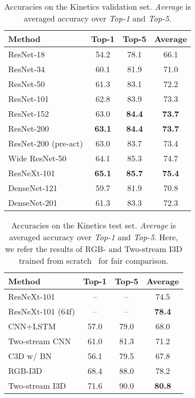 \documentclass[10pt,twocolumn,letterpaper]{article}
\begin{document}
    \begin{table}[t]
      \centering
      \captionsetup{width=0.95\linewidth}
      \caption{
        Accuracies on the Kinetics validation set.
        \textit{Average} is averaged accuracy over \textit{Top-1} and \textit{Top-5}.
      }\label{tbl:kinetics_val}
      \begin{tabular}{lccc}
        \toprule
        Method & Top-1 & Top-5 & Average \\
        \midrule
        ResNet-18 & 54.2 & 78.1 & 66.1 \\
        ResNet-34 & 60.1 & 81.9 & 71.0 \\
        ResNet-50 & 61.3 & 83.1 & 72.2 \\
        ResNet-101 & 62.8 & 83.9 & 73.3 \\
        ResNet-152 & 63.0 & \textbf{84.4} & \textbf{73.7} \\
        ResNet-200 & \textbf{63.1} & \textbf{84.4} & \textbf{73.7} \\
        \midrule
        ResNet-200 (pre-act) & 63.0 & 83.7 & 73.4 \\
        Wide ResNet-50 & 64.1 & 85.3 & 74.7 \\
        ResNeXt-101 & \textbf{65.1} & \textbf{85.7} & \textbf{75.4} \\
        DenseNet-121 & 59.7 & 81.9 & 70.8 \\
        DenseNet-201 & 61.3 & 83.3 & 72.3 \\
        \bottomrule          
      \end{tabular}
    \end{table}
    \begin{table}[t]
      \centering
      \caption{
        Accuracies on the Kinetics test set.
        \textit{Average} is averaged accuracy over \textit{Top-1} and \textit{Top-5}.
        Here, we refer the results of RGB- and Two-stream I3D trained from scratch~\cite{I3D_arxiv} for fair comparison.
      }\label{tbl:kinetics_test}
      \begin{tabular}{L{37.8mm}ccc}
        \toprule
        Method & Top-1 & Top-5 & Average \\
        \midrule
        ResNeXt-101 & -- & -- & 74.5 \\
        ResNeXt-101 (64f) & -- & -- & \textbf{78.4} \\
        \midrule
        CNN+LSTM~\cite{Kinetics} & 57.0 & 79.0 & 68.0 \\
        Two-stream CNN~\cite{Kinetics} & 61.0 & 81.3 & 71.2 \\
        C3D w/ BN~\cite{Kinetics} & 56.1 & 79.5 & 67.8 \\
        RGB-I3D~\cite{I3D_arxiv} & 68.4 & 88.0 & 78.2 \\
        Two-stream I3D~\cite{I3D_arxiv} & 71.6 & 90.0 & \textbf{80.8} \\
        \bottomrule
      \end{tabular}
    \end{table}
\end{document}
